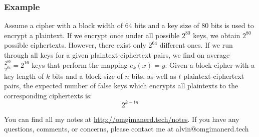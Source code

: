 \documentclass{math}
\begin{document}
\subsubsection*{Example}
Assume a cipher with a block width of 64 bits and a key size of 80 bits is used
to encrypt a plaintext. If we encrypt once under all possible \( 2^80 \) keys,
we obtain \( 2^80 \) possible ciphertexts. However, there exist only \( 2^64 \)
different ones. If we run through all keys for a given plaintext-ciphertext
pairs, we find on average \( \frac{2^80}{2^64} = 2^16 \) keys that perform the
mapping \( e_k(x) = y \). Given a block cipher with a key length of \( k \)
bits and a block size of \( n \) bits, as well as \( t \) plaintext-ciphertext
pairs, the expected number of false keys which encrypts all plaintexts to the
corresponding ciphertexts is:
\[ 2^{k-tn} \]

\begin{center}
  You can find all my notes at \url{http://omgimanerd.tech/notes}. If you have
  any questions, comments, or concerns, please contact me at
  alvin@omgimanerd.tech
\end{center}
\end{document}
